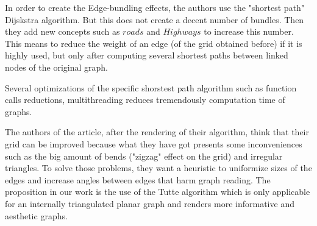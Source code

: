 
In order to create the Edge-bundling effects, the authors use the "shortest path" Dijskstra  algorithm. But this does not create a decent number of bundles. Then they add new concepts such as $roads$ and $Highways$ to increase this number. This means to reduce the weight of an edge (of the grid obtained before) if it is highly used, but only after computing several shortest paths between linked nodes of the original graph. 

  Several optimizations of the specific shorstest path algorithm such as function calls reductions, multithreading reduces tremendously computation time of graphs.


The authors of the article, after the rendering of their algorithm, think that their grid can be improved because what they have got presents some inconveniences such as the big amount of bends ("zigzag" effect on the grid) and irregular triangles. To solve those problems, they want a heuristic to uniformize sizes of the edges and increase angles between edges that harm graph reading. The proposition in our work is the use of  the Tutte algorithm which is only applicable for an internally triangulated planar graph and renders more informative and aesthetic graphs.

